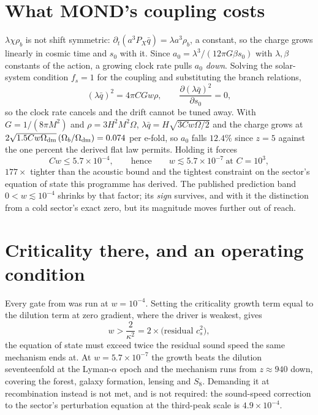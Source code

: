 \documentclass[11pt,letterpaper]{article}
\begin{document}
\section{What MOND's coupling costs}
$\lambda\chi\rho_b$ is not shift symmetric: $\partial_t(a^3P_X\bar q)=\lambda a^3\rho_b$, a constant, so the charge grows linearly in cosmic time and $s_0$ with it. Since $a_0=\lambda^3/(12\pi G\beta s_0)$ with $\lambda,\beta$ constants of the action, a growing clock rate pulls $a_0$ \emph{down}. Solving the solar-system condition $f_s=1$ for the coupling and substituting the branch relations,
\begin{equation}
(\lambda\bar q)^2=4\pi CGw\rho,\qquad \frac{\partial(\lambda\bar q)^2}{\partial s_0}=0,
\end{equation}
so the clock rate cancels and the drift cannot be tuned away. With $G=1/(8\pi M^2)$ and $\rho=3H^2M^2\Omega$, $\lambda\bar q=H\sqrt{3Cw\Omega/2}$ and the charge grows at $2\sqrt{1.5Cw\Omega_{\rm dm}}\,(\Omega_b/\Omega_{\rm dm})=0.074$ per e-fold, so $a_0$ falls $12.4\%$ since $z=5$ against the one percent the derived flat law permits. Holding it forces
\begin{equation}
Cw\le5.7\times10^{-4},\qquad\text{hence}\qquad w\lesssim5.7\times10^{-7}\ \text{at }C=10^3,
\end{equation}
$177\times$ tighter than the acoustic bound and the tightest constraint on the sector's equation of state this programme has derived. The published prediction band $0<w\lesssim10^{-4}$ shrinks by that factor; its \emph{sign} survives, and with it the distinction from a cold sector's exact zero, but its magnitude moves further out of reach.

\section{Criticality there, and an operating condition}
Every gate from \cite{paper19,paper20} was run at $w=10^{-4}$. Setting the criticality growth term equal to the dilution term at zero gradient, where the driver is weakest, gives
\begin{equation}
w>\frac{2}{\kappa^2}=2\times\text{(residual }c_s^2),
\end{equation}
the equation of state must exceed twice the residual sound speed the same mechanism ends at. At $w=5.7\times10^{-7}$ the growth beats the dilution seventeenfold at the Lyman-$\alpha$ epoch and the mechanism runs from $z\approx940$ down, covering the forest, galaxy formation, lensing and $S_8$. Demanding it at recombination instead is not met, and is not required: the sound-speed correction to the sector's perturbation equation at the third-peak scale is $4.9\times10^{-4}$.
\end{document}
